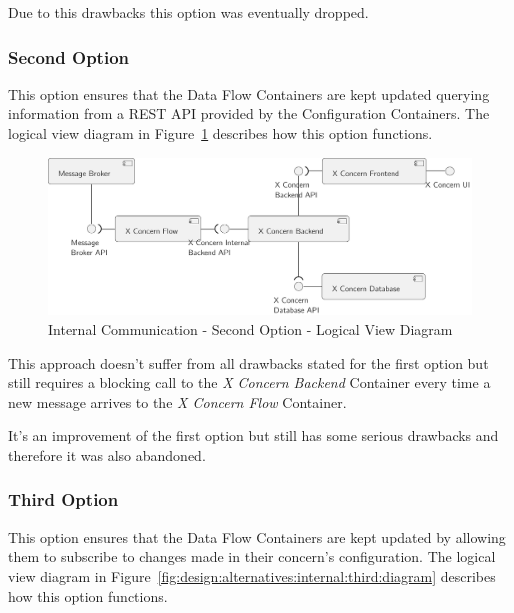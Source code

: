 Due to this drawbacks this option was eventually dropped.

\subsubsection{Second Option}
\label{subsubsec:design:alternatives:internal:second}

This option ensures that the Data Flow Containers are kept updated querying information from a \gls{REST} \gls{API} provided by the Configuration Containers. The logical view diagram in Figure~\ref{fig:design:alternatives:internal:second:diagram} describes how this option functions.

\begin{figure}[H]
   \centering
   \includegraphics[page=1,width=0.8\columnwidth]{assets/diagrams/design/alternatives/internal/alternative2.pdf}
   \caption[Internal Communication - Second Option - Logical View Diagram]{Internal Communication - Second Option - Logical View Diagram}
   \label{fig:design:alternatives:internal:second:diagram}
\end{figure}

This approach doesn't suffer from all drawbacks stated for the first option but still requires a blocking call to the \textit{X Concern Backend} Container every time a new message arrives to the \textit{X Concern Flow} Container.

It's an improvement of the first option but still has some serious drawbacks and therefore it was also abandoned.

\subsubsection{Third Option}
\label{subsubsec:design:alternatives:internal:third}

This option ensures that the Data Flow Containers are kept updated by allowing them to subscribe to changes made in their concern's configuration. The logical view diagram in Figure~\ref{fig:design:alternatives:internal:third:diagram} describes how this option functions.

